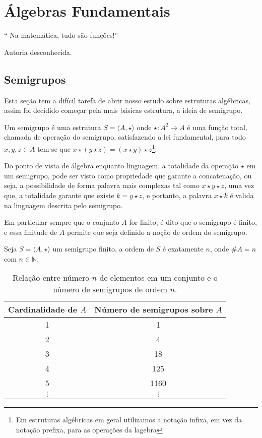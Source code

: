 \chapter{Álgebras Fundamentais}\label{cap:Semigroups}

\epigraph{``-Na matemática, tudo são funções!''}{Autoria desconhecida.}

\section{Semigrupos}\label{sec:basicSemigroups}

Esta seção tem a difícil tarefa de abrir nosso estudo sobre estruturas algébricas, assim foi decidido começar pela mais básicas estrutura, a ideia de semigrupo.

\begin{definicao}[Semigrupo]\label{def:Semigrupo}
  Um semigrupo é uma estrutura $S = \langle A, \star \rangle$ onde $\star: A^2 \rightarrow A$ é uma função total, chamada de operação do semigrupo, satisfazendo a lei fundamental, para todo $x, y, z \in A$ tem-se que $x \star (y \star z) = (x \star y) \star z$\footnote{Em estruturas algébricas em geral utilizamos a notação infixa, em vez da notação prefixa, para as operações da lagebra}.
\end{definicao}

Do ponto de vista de álgebra enquanto linguagem, a totalidade da operação $\star$ em um semigrupo, pode ser visto como propriedade que garante a concatenação, ou seja, a possibilidade de forma palavra mais complexas tal como $x \star y \star z$, uma vez que, a totalidade garante que existe $k = y \star z$, e portanto, a palavra $x \star k$ é valida na linguagem descrita pelo semigrupo.

Em particular sempre que o conjunto $A$ for finito, é dito que o semigrupo é finito, e essa finitude de $A$ permite que seja definido a noção de ordem do semigrupo.

\begin{definicao}
  Seja $S = \langle A, \star \rangle$ um semigrupo finito, a ordem de $S$ é exatamente $n$, onde $\# A = n$ com $n \in \mathbb{N}$.
\end{definicao}

\begin{table}
  \centering
  \begin{tabular}{c|c}
    \hline
    Cardinalidade de $A$ & Número de semigrupos sobre $A$\\
    \hline
    1 & 1\\
    2 & 4\\
    3 & 18\\
    4 & 125\\
    5 & 1160\\
    $\vdots$ & $\vdots$\\
    \hline
  \end{tabular}
  \caption{Relação entre número $n$ de elementos em um conjunto e o número de semigrupos de ordem $n$.}
  \label{tab:OrdemElementosBasicosSemigrupo}
\end{table}

